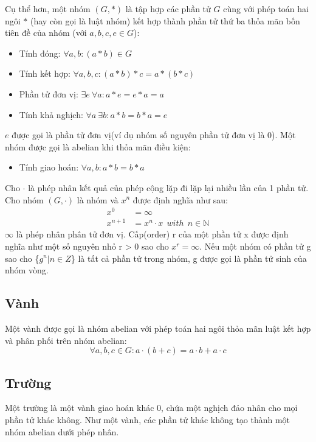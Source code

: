 \documentclass[a4paper,12pt]{report}
\begin{document}
Cụ thể hơn, một nhóm $(G, *)$ là tập hợp các phần tử $G$ cùng với phép toán hai ngôi $*$ (hay còn gọi là luật nhóm) kết hợp thành phần tử thứ ba thỏa mãn bốn tiên đề của nhóm (với $ a, b , c, e \in G$):

\begin{itemize}
\item Tính đóng: $\forall a, b: (a * b) \in G$
\item Tính kết hợp: $\forall a, b, c: (a * b) * c = a * (b * c)$
\item Phần tử đơn vị: $\exists e \ \forall a: a * e = e * a = a$
\item Tính khả nghịch: $\forall a \ \exists b: a * b = b * a = e$
\end{itemize}
$e$ được gọi là phần tử đơn vị(ví dụ nhóm số nguyên phần tử đơn vị là 0). Một nhóm được gọi là abelian  khi thỏa mãn điều kiện:
\begin{itemize}
\item Tính giao hoán: $\forall a,b: a * b = b * a$
\end{itemize}

Cho $\cdot$ là phép nhân kết quả của phép cộng lặp đi lặp lại nhiều lần của 1 phần tử. Cho nhóm $(G, \cdot)$ là nhóm và $x^n$ được định nghĩa như sau:
\begin{displaymath}
\begin{aligned}
x^0 & = \infty \\
x^{n + 1} & = x^n\cdot x \ \ with \ \ n \in \mathbb{N}
\end{aligned}
\end{displaymath}
$\infty$ là phép nhân phân tử đơn vị. Cấp(order) r của một phần tử x được định nghĩa như một số nguyên nhỏ r > 0 sao cho $x^r = \infty$. Nếu một nhóm có phần tử g sao cho \{$g^n | n \in Z$\} là tất cả phần tử trong nhóm, g được gọi là phần tử sinh của nhóm vòng.
\subsection*{Vành}
Một vành được gọi là nhóm abelian  với phép toán hai ngôi thỏa mãn luật kết hợp và phân phối trên nhóm abelian:
\begin{displaymath}
\forall a, b, c \in G: a\cdot (b + c) = a \cdot b + a \cdot c
\end{displaymath}
\subsection*{Trường}
Một trường là một vành giao hoán khác 0, chứa một nghịch đảo nhân cho mọi phần tử khác không. Như một vành, các phần tử khác không tạo thành một nhóm abelian dưới phép nhân.
\end{document}
